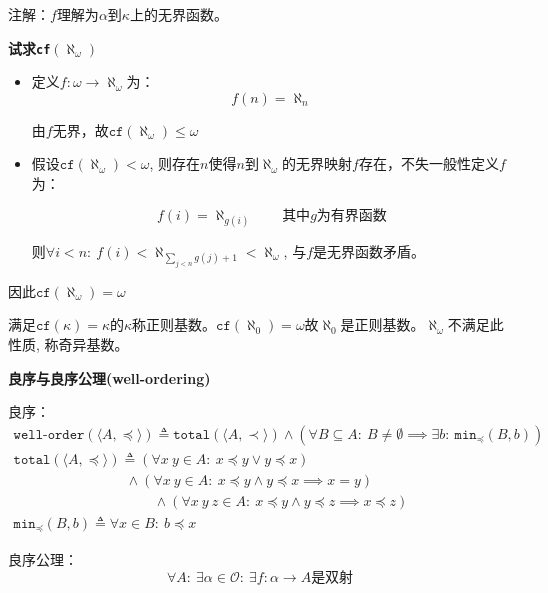 \documentclass[UTF8, 9pt, a4paper]{ctexart}
\newcommand{\ksec}[2]{\noindent \textbf{\large #1} #2\par}
\begin{document}
	注解：$ f $理解为$ \alpha $到$ \kappa $上的无界函数。
	
	
	\textbf{试求\texttt{cf}$ (\aleph_\omega) $}
	\begin{itemize}
		\item 定义$ f: \omega \rightarrow \aleph_\omega $为：
		$$ f(n) = \aleph_n $$
		
		由$ f $无界，故$ \texttt{cf}(\aleph_\omega) \leq \omega $
		
		\item 假设$ \texttt{cf}(\aleph_\omega) < \omega $, 则存在$ n $使得$ n $到$ \aleph_\omega $的无界映射$ f $存在，不失一般性定义$ f $为：
		
		$$ f(i) = \aleph_{g(i)}  \qquad \texttt{其中}g\texttt{为有界函数}$$
		
		则$ \forall i < n:\ f(i) < \aleph_{\sum\limits_{j < n}g(j) + 1} < \aleph_\omega $, 与$ f $是无界函数矛盾。
	\end{itemize}

	因此$ \texttt{cf}(\aleph_\omega) = \omega $
	
	\vspace{0.3cm}
	
	满足$ \texttt{cf}(\kappa) = \kappa $的$ \kappa $称正则基数。$ \texttt{cf}(\aleph_0) = \omega $故$ \aleph_0 $是正则基数。$ \aleph_\omega $不满足此性质, 称奇异基数。
	
	
	\ksec{良序与良序公理(well-ordering)}{}
	良序：$$ \begin{array}{ll}
		\texttt{well-order}(\langle A, \preceq \rangle) \triangleq \texttt{total}(\langle A, \prec \rangle) \land (\forall B \subseteq A:\ B \neq \emptyset \implies \exists b:\ \texttt{min}_\preceq(B, b))\\
		
		\texttt{total}(\langle A, \preceq \rangle) \triangleq (\forall x\ y \in A:\ x \preceq y \lor y \preceq x) \\
		\qquad \qquad \qquad \qquad \land (\forall x\ y \in A:\ x \preceq y \land y \preceq x \implies x = y) \\
		\qquad \qquad \qquad \qquad \qquad \land (\forall x\ y\ z \in A:\ x \preceq y \land y \preceq z \implies x \preceq z)\\
		
		\texttt{min}_\preceq(B, b) \triangleq \forall x \in B:\ b \preceq x
	\end{array} $$
	
	
	良序公理：$$ \forall A:\ \exists \alpha \in \mathcal{O}:\ \exists f: \alpha \rightarrow A\texttt{是双射} $$
	
\end{document}
